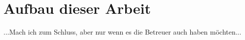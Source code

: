 






\section{Aufbau dieser Arbeit}

...Mach ich zum Schluss, aber nur wenn es die Betreuer auch haben möchten...






